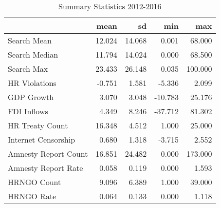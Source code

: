 \begin{table}[ht]
\centering
\begin{tabular}{|l|rrrr|}
  \hline
 & mean & sd & min & max \\ 
  \hline
Search Mean & 12.024 & 14.068 & 0.001 & 68.000 \\ 
  Search Median & 11.794 & 14.024 & 0.000 & 68.500 \\ 
  Search Max & 23.433 & 26.148 & 0.035 & 100.000 \\ 
  HR Violations & -0.751 & 1.581 & -5.336 & 2.099 \\ 
  GDP Growth & 3.070 & 3.048 & -10.783 & 25.176 \\ 
  FDI Inflows & 4.349 & 8.246 & -37.712 & 81.302 \\ 
  HR Treaty Count & 16.348 & 4.512 & 1.000 & 25.000 \\ 
  Internet Censorship & 0.680 & 1.318 & -3.715 & 2.552 \\ 
  Amnesty Report Count & 16.851 & 24.482 & 0.000 & 173.000 \\ 
  Amnesty Report Rate & 0.058 & 0.119 & 0.000 & 1.593 \\ 
  HRNGO Count & 9.096 & 6.389 & 1.000 & 39.000 \\ 
  HRNGO Rate & 0.064 & 0.133 & 0.000 & 1.118 \\ 
   \hline
\end{tabular}
\caption{Summary Statistics 2012-2016} 
\end{table}
